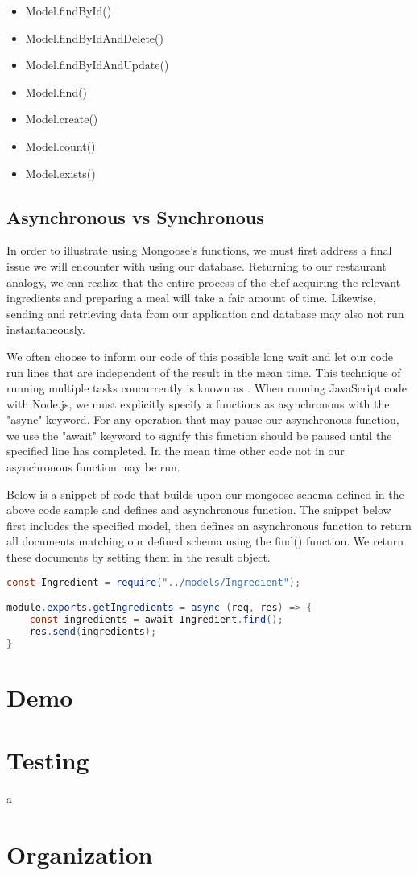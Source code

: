 \begin{itemize}
    \item Model.findById()
    \item Model.findByIdAndDelete()
    \item Model.findByIdAndUpdate()
    \item Model.find()
    \item Model.create()
    \item Model.count()
    \item Model.exists()
\end{itemize}

\subsection*{Asynchronous vs Synchronous}

In order to illustrate using Mongoose's functions, we must first address a final issue we will encounter with using our database. Returning to our restaurant analogy, we can realize that the entire process of the chef acquiring the relevant ingredients and preparing a meal will take a fair amount of time. Likewise, sending and retrieving data from our application and database may also not run instantaneously.

We often choose to inform our code of this possible long wait and let our code run lines that are independent of the result in the mean time. This technique of running multiple tasks concurrently is known as . When running JavaScript code with Node.js, we must explicitly specify a functions as asynchronous with the "async" keyword. For any operation that may pause our asynchronous function, we use the "await" keyword to signify this function should be paused until the specified line has completed. In the mean time other code not in our asynchronous function may be run.

Below is a snippet of code that builds upon our mongoose schema defined in the above code sample and defines and asynchronous function. The snippet below first includes the specified model, then defines an asynchronous function to return all documents matching our defined schema using the find() function. We return these documents by setting them in the result object.

\begin{lstlisting}[language=Java]
const Ingredient = require("../models/Ingredient");

module.exports.getIngredients = async (req, res) => {
    const ingredients = await Ingredient.find();
    res.send(ingredients);
}
\end{lstlisting}
    
\section{Demo}

\section{Testing}a

\section{Organization}
